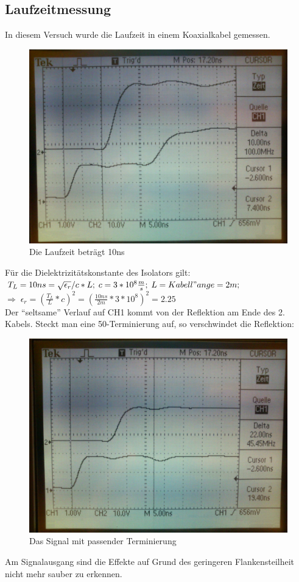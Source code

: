 \subsection{Laufzeitmessung}
In diesem Versuch wurde die Laufzeit in einem Koaxialkabel gemessen.
\begin{figure}[H]
	\centering
	\includegraphics[width=\linewidth]{versuch4/oszi/DSC_0349.JPG}
	\caption{Die Laufzeit beträgt 10ns}
\end{figure}
Für die Dielektrizitätskonstante des Isolators gilt:\\
$ T_L=10ns=\sqrt{\epsilon_r}/c*L;\; c = 3*10^8 \frac{m}{s};\; L=Kabell"ange=2m;$\\
$ \Rightarrow\; \epsilon_r=(\frac{T_L}{L}*c)^2=(\frac{10ns}{2m}*3*10^8)^2=2.25 $\\

Der "`seltsame"' Verlauf auf CH1 kommt von der Reflektion am Ende des 2. Kabels. Steckt man eine 50\Ohm -Terminierung auf, so verschwindet die Reflektion:
\begin{figure}[H]
	\centering
	\includegraphics[width=\linewidth]{versuch4/oszi/DSC_0353.JPG}
	\caption{Das Signal mit passender Terminierung}
\end{figure}
Am Signalausgang sind die Effekte auf Grund des geringeren Flankensteilheit nicht mehr sauber zu erkennen.

